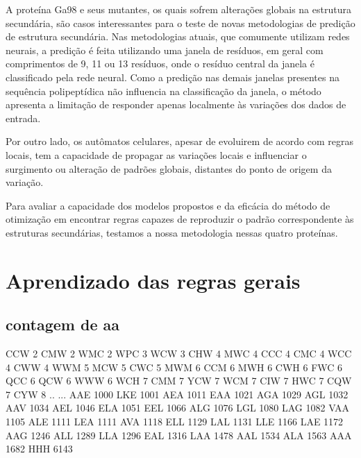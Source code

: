 A proteína Ga98 e seus mutantes, os quais sofrem alterações globais na estrutura secundária, são casos interessantes para o teste de novas metodologias de predição de estrutura secundária. Nas metodologias atuais, que comumente utilizam redes neurais, a predição é feita utilizando uma janela de resíduos, em geral com comprimentos de 9, 11 ou 13 resíduos, onde o resíduo central da janela é classificado pela rede neural. Como a predição nas demais janelas presentes na sequência polipeptídica não influencia na classificação da janela, o método apresenta a limitação de responder apenas localmente às variações dos dados de entrada.  

Por outro lado, os autômatos celulares, apesar de evoluirem de acordo com regras locais, tem a capacidade de propagar as variações locais e influenciar o surgimento ou alteração de padrões globais, distantes do ponto de origem da variação. 

Para avaliar a capacidade dos modelos propostos e da eficácia do método de otimização em encontrar regras capazes de reproduzir o padrão correspondente às estruturas secundárias, testamos a nossa metodologia nessas quatro proteínas.



\chapter{Aprendizado das regras gerais}




\section{contagem de aa}
CCW      2
CMW      2
WMC      2
WPC      3
WCW      3
CHW      4
MWC      4
CCC      4
CMC      4
WCC      4
CWW      4
WWM      5
MCW      5
CWC      5
MWM      6
CCM      6
MWH      6
CWH      6
FWC      6
QCC      6
QCW      6
WWW      6
WCH      7
CMM      7
YCW      7
WCM      7
CIW      7
HWC      7
CQW      7
CYW      8
..     ...
AAE   1000
LKE   1001
AEA   1011
EAA   1021
AGA   1029
AGL   1032
AAV   1034
AEL   1046
ELA   1051
EEL   1066
ALG   1076
LGL   1080
LAG   1082
VAA   1105
ALE   1111
LEA   1111
AVA   1118
ELL   1129
LAL   1131
LLE   1166
LAE   1172
AAG   1246
ALL   1289
LLA   1296
EAL   1316
LAA   1478
AAL   1534
ALA   1563
AAA   1682
HHH   6143